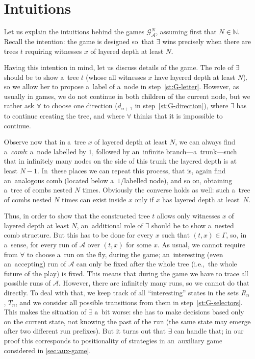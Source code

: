 \documentclass[11pt,a4paper]{amsart}
\theoremstyle{plain}
\theoremstyle{definition}
\theoremstyle{defC}
\theoremstyle{thmC}
\theoremstyle{plain}
\numberwithin{equation}{section}
\numberwithin{equation}{section}
\numberwithin{figure}{section}
\newcommand{\domain}[1]{\ensuremath{\mathbb{#1}}\xspace}
\newcommand{\N}{\domain{N}}
\newcommand{\mathcalsym}[1]{\ensuremath{\mathcal{#1}}\xspace}
\newcommand{\CA}{\mathcalsym{A}}
\newcommand{\CG}{\mathcalsym{G}}
\newcommand{\eve}{\ensuremath{\exists}\xspace}
\newcommand{\adam}{\ensuremath{\forall}\xspace}
\begin{document}
\section{Intuitions}
\label{sec:intuitions}

Let us explain the intuitions behind the games $\CG^N_\CA$, assuming first that $N\in\N$.
Recall the intention: the game is designed so~that \eve wins precisely when there are trees $t$ requiring witnesses $x$ of layered depth at least $N$.

Having this intention in mind, let us discuss details of the game.
The role of \eve should be to show a~tree $t$ (whose all witnesses $x$ have layered depth at least $N$), so we allow her to propose a~label of a~node in step~\ref{st:G-letter}.
However, as usually in games, we do not continue in both children of the current node, but we rather ask \adam to choose one direction ($d_{n+1}$ in step~\ref{st:G-direction}),
where \eve has to continue creating the tree, and where \adam thinks that it is impossible to continue.

Observe now that in a~tree $x$ of layered depth at least $N$, we can always find a~\emph{comb}:
a~node labelled by $1$, followed by an~infinite branch---a~trunk---such that in infinitely many nodes on the side of this trunk the layered depth is at least $N{-}1$.
In~these places we can repeat this process, that is, again find an~analogous comb (located below a~$1$\=/labelled node), and so on, obtaining a~tree of combs nested $N$ times.
Obviously the converse holds as well: such a~tree of combs nested $N$ times can exist inside $x$ only if $x$ has layered depth at least~$N$.

Thus, in order to show that the constructed tree $t$ allows only witnesses $x$ of layered depth at least $N$, an~additional role of \eve should be to show a~nested comb structure.
But this has to be done for every $x$ such that $(t,x)\in\Gamma$, so, in a~sense, for every run of $\CA$ over $(t,x)$ for some $x$.
As usual, we cannot require from \adam to choose a~run on the fly, during the game;
an~interesting (even an~accepting) run of \CA can only be fixed after the whole tree (i.e.,~the whole future of the play) is fixed.
This means that during the game we have to trace all possible runs of $\CA$.
However, there are infinitely many runs, so we cannot do that directly.
To deal with that, we keep track of all ``interesting'' states in the sets $R_n$, $T_n$,
and we consider all possible transitions from them in step~\ref{st:G-selectors}.
This makes the situation of \eve a~bit worse: she has to make decisions based only on the current state, not knowing the past of the run
(the same state may emerge after two different run prefixes).
But it turns out that \eve can handle that; in our proof this corresponds to positionality of strategies in an~auxiliary game considered in \cref{sec:aux-game}.
\end{document}
